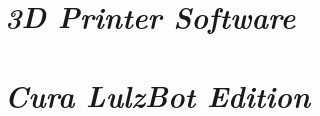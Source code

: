 \documentclass[twoside,12pt,openright,final,english]{memoir}
\newif\ifsoftware\softwaretrue %
\newif\ifcura\curatrue %
\newif\ifprintrun\printrunfalse %
\newif\iffilament\filamentfalse %
\newif\iffirstprint\firstprintfalse %
\begin{document}
\iffilament
\chapter{\emph{Loading Filament}}
\thispagestyle{empty}
\markboth{Loading Filament}{LulzBot Mini User Manual}
{}
\fi

\ifsoftware
\chapter{\emph{3D Printer Software}}
\thispagestyle{empty}
{}
\fi


\ifcura
\chapter{\emph{Cura LulzBot Edition}}
\thispagestyle{empty}
{}
\fi

\ifprintrun
\chapter{\emph{Printrun}}
\thispagestyle{empty}
\markboth{Printrun}{LulzBot Mini User Manual}
{}
\fi

\iffirstprint
\end{document}
